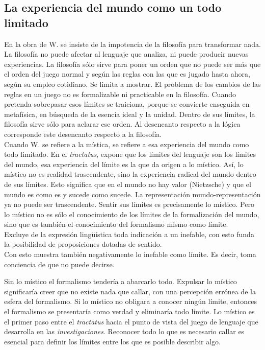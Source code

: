 \documentclass[a4paper, 11pt, twocolumn, spanish]{article}
\begin{document}
\subsection{La experiencia del mundo como un todo limitado}
\label{sec:org7cc4260}
En la obra de W. se insiste de la impotencia de la filosofía para
transformar nada. La filosofía no puede afectar al lenguaje que
analiza, ni puede producir nuevas experiencias. La filosofía sólo
sirve para poner un orden que no puede ser más que el orden del juego
normal y según las reglas con las que es jugado hasta ahora, según su
empleo cotidiano. Se limita a mostrar. El problema de los cambios de
las reglas en un juego no es formalizable ni practicable en la
filosofía. Cuando pretenda sobrepasar esos límites se traiciona,
porque se convierte enseguida en metafísica, en búsqueda de la esencia
ideal y la unidad. Dentro de sus límites, la filosofía sirve sólo para
aclarar ese orden. Al desencanto respecto a la lógica corresponde este
desencanto respecto a la filosofía.\\

Cuando W. se refiere a la mística, se refiere a esa experiencia del
mundo como todo limitado. En el \emph{tractatus}, expone que los límites
del lenguaje son los límites del mundo, esa experiencia del límite es
la que da origen a lo místico. Así, lo místico no es realidad
trascendente, sino la experiencia radical del mundo dentro de sus
límites. Esto significa que en el mundo no hay valor (Nietzsche) y que
el mundo es como es y sucede como sucede. La representación
mundo-representación ya no puede ser trascendente. Sentir sus límites
es precisamente lo místico. Pero lo místico no es sólo el conocimiento
de los límites de la formalización del mundo, sino que es también el
conocimiento del formalismo mismo como límite.\\
Excluye de la expresión lingüística toda indicación a un inefable, con
esto funda la posibilidad de proposiciones dotadas de sentido.\\
Con esto muestra también negativamente lo inefable como límite. Es
decir, toma conciencia de que no puede decirse.

Sin lo místico el formalismo tendería a abarcarlo todo. Expulsar lo
místico significaría creer que no existe nada que callar, con una
percepción errónea de la esfera del formalismo. Si lo místico no
obligara a conocer ningún límite, entonces el formalismo se
presentaría como verdad y eliminaría todo límite. Lo místico es el
primer paso entre el \emph{tractatus} hacia el punto de vista del juego de
lenguaje que desarrolla en las \emph{investigaciones}. Reconocer todo lo
que es necesario callar es esencial para definir los límites entre los
que es posible describir algo.
\end{document}
